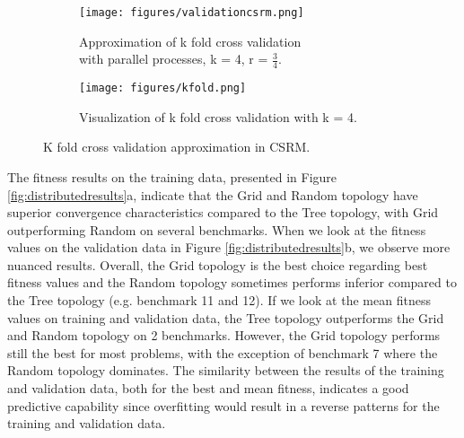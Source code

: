 \begin{figure}
    \label{fig:ckfold}
	\begin{subfigure}{0.5\textwidth}\label{fig:csrmkfold}
    \texttt{[image: figures/validationcsrm.png]}
    \caption{Approximation of k fold cross validation \\with parallel processes, k = 4,  r = $\frac{3}{4}$.}
    \end{subfigure}
	\begin{subfigure}{0.5\textwidth}    \label{fig:kfold}

    \centering
    \texttt{[image: figures/kfold.png]}
    \caption{Visualization of k fold cross validation with k = 4.}
    \end{subfigure}%
    \caption{K fold cross validation approximation in CSRM.}
 \end{figure}

The fitness results on the training data, presented in Figure \ref{fig:distributedresults}a, indicate that the Grid and Random topology have superior convergence characteristics compared to the Tree topology, with Grid outperforming Random on several benchmarks. When we look at the fitness values on the validation data in Figure \ref{fig:distributedresults}b, we observe more nuanced results. Overall, the Grid topology is the best choice regarding best fitness values and the Random topology sometimes performs inferior compared to the Tree topology (e.g. benchmark 11 and 12). If we look at the mean fitness values on training and validation data, the Tree topology outperforms the Grid and Random topology on 2 benchmarks. However, the Grid topology performs still the best for most problems, with the exception of benchmark 7 where the Random topology dominates. The similarity between the results of the training and validation data, both for the best and mean fitness, indicates a good predictive capability since overfitting would result in a reverse patterns for the training and validation data.

